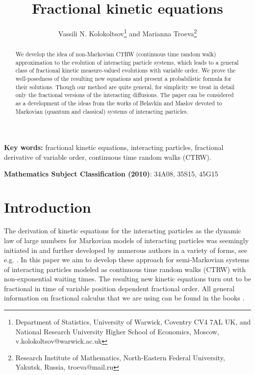 \documentclass[12pt]{article}
\numberwithin{equation}{section}
\begin{document}
\title{Fractional kinetic equations}

\author{
	Vassili N. Kolokoltsov\thanks{Department of Statistics, University of Warwick,
		Coventry CV4 7AL UK, and National Research University Higher School of Economics, Moscow, v.kolokoltsov@warwick.ac.uk}
	and Marianna Troeva\thanks{Research Institute of Mathematics, North-Eastern Federal University,
		Yakutsk, Russia, troeva@mail.ru
	}}	

\maketitle


\begin{abstract}
We develop the idea of non-Markovian CTRW (continuous time random walk) approximation to the
evolution of interacting particle systems, which leads to a general class of fractional kinetic
measure-valued evolutions with variable order.
 We prove the well-posedness of the resulting new equations and present
 a probabilistic formula for their solutions. Though our method are quite general,
 for simplicity we treat in detail only the fractional versions of the
 interacting diffusions. The paper can be considered as a development of the ideas
 from the works of Belavkin and Maslov devoted to Markovian (quantum and classical) systems of interacting particles.
\end{abstract}

{\bf Key words:} fractional kinetic equations, interacting particles,
fractional derivative of variable order,
continuous time random walks (CTRW).

{\bf Mathematics Subject Classification (2010)}: {34A08, 35S15, 45G15}


\section{Introduction}

The derivation of kinetic equations for the interacting particles as the dynamic law of large numbers
for Markovian models of interacting particles was seemingly initiated in \cite{Leon} and further developed
by numerous authors in a variety of forms, see e.g. \cite{BelKol, BelMas,Kac, MasTar}.
In this paper we aim to develop these approach for semi-Markovian systems of interacting particles modeled
as continuous time random walks (CTRW) with non-exponential waiting times. The resulting new kinetic equations
turn out to be fractional in time of variable position dependent fractional order.
All general information on fractional calculus that we are using can be found in the
books \cite{Scalabook,Kir94,Podlub99}.
\end{document}
